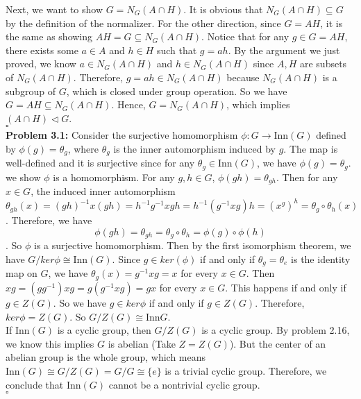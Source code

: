 \documentclass[12pt]{amsart}
\begin{document}
    Next, we want to show $G=N_G(A\cap H)$. It is obvious that $N_G(A\cap H)\subseteq G$ by the definition of the normalizer. For the other direction, since $G=AH$, it is the same as showing $AH=G\subseteq N_G(A\cap H)$. Notice that for any $g\in G=AH$, there exists some $a\in A$ and $h\in H$ such that $g=ah$. By the argument we just proved, we know $a\in N_G(A\cap H)$ and $h\in N_G(A\cap H)$ since $A,H$ are subsets of $N_G(A\cap H)$. Therefore, $g=ah\in N_G(A\cap H)$ because $N_G(A\cap H)$ is a subgroup of $G$, which is closed under group operation. So we have $G=AH\subseteq N_G(A\cap H)$. Hence, $G=N_G(A\cap H)$, which implies $(A\cap H)\triangleleft G$.
    \\\phantom{qed}\hfill$\square$\\
    \textbf{Problem 3.1:} Consider the surjective homomorphism $\phi: G\rightarrow \text{Inn}(G)$ defined by $\phi(g)=\theta_g$, where $\theta_g$ is the inner automorphism induced by $g$. The map is well-defined and it is surjective since for any $\theta_g\in \text{Inn}(G)$, we have $\phi(g)=\theta_g$. we show $\phi$ is a homomorphism. For any $g,h\in G$, $\phi(gh)=\theta_{gh}$. Then for any $x\in G$, the induced inner automorphism $\theta_{gh}(x)=(gh)^{-1}x(gh)=h^{-1}g^{-1}xgh=h^{-1}(g^{-1}xg)h=(x^g)^h=\theta_g\circ \theta_h(x)$. Therefore, we have $$\phi(gh)=\theta_{gh}=\theta_g\circ \theta_h=\phi(g)\circ \phi(h)$$.
    So $\phi$ is a surjective homomorphism. Then by the first isomorphism theorem, we have $G/ker\phi\cong \text{Inn}(G)$. Since $g\in ker(\phi)$ if and only if $\theta_g=\theta_e$ is the identity map on $G$, we have $\theta_g(x)=g^{-1}xg=x$ for every $x\in G$. Then $xg=(gg^{-1})xg=g(g^{-1}xg)=gx$ for every $x\in G$. This happens if and only if $g\in Z(G)$. So we have $g\in ker\phi$ if and only if $g\in Z(G)$. Therefore, $ker\phi=Z(G)$. So $G/Z(G)\cong \text{Inn}G$.\\
    If Inn$(G)$ is a cyclic group, then $G/Z(G)$ is a cyclic group. By problem 2.16, we know this implies $G$ is abelian (Take $Z=Z(G)$). But the center of an abelian group is the whole group, which means $\text{Inn}(G)\cong G/Z(G)=G/G\cong \{e\}$ is a trivial cyclic group. Therefore, we conclude that Inn$(G)$ cannot be a nontrivial cyclic group.
    \\\phantom{qed}\hfill$\square$\\
\end{document}
